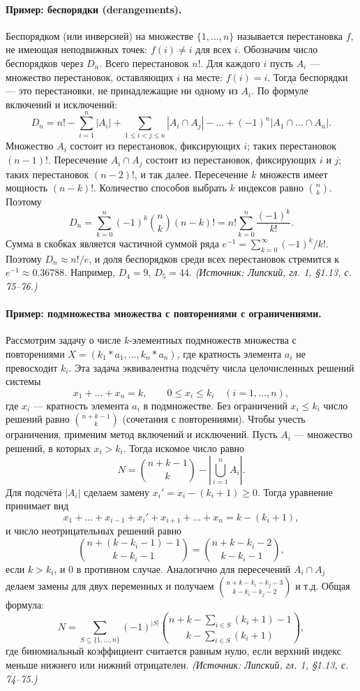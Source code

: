 \documentclass[a4paper,12pt]{article}
\begin{document}
\paragraph{Пример: беспорядки (derangements).}
Беспорядком (или инверсией) на множестве \(\{1,\dots,n\}\) называется перестановка \(f\), не имеющая неподвижных точек: \(f(i)\ne i\) для всех \(i\). Обозначим число беспорядков через \(D_n\). Всего перестановок \(n!\). Для каждого \(i\) пусть \(A_i\) — множество перестановок, оставляющих \(i\) на месте: \(f(i)=i\). Тогда беспорядки — это перестановки, не принадлежащие ни одному из \(A_i\). По формуле включений и исключений:
\[
D_n = n! - \sum_{i=1}^n |A_i| + \sum_{1\le i<j\le n} |A_i\cap A_j| - \dots + (-1)^n |A_1\cap\dots\cap A_n|.
\]
Множество \(A_i\) состоит из перестановок, фиксирующих \(i\); таких перестановок \((n-1)!\). Пересечение \(A_i\cap A_j\) состоит из перестановок, фиксирующих \(i\) и \(j\); таких перестановок \((n-2)!\), и так далее. Пересечение \(k\) множеств имеет мощность \((n-k)!\). Количество способов выбрать \(k\) индексов равно \(\binom{n}{k}\). Поэтому
\[
D_n = \sum_{k=0}^{n} (-1)^k \binom{n}{k} (n-k)! = n! \sum_{k=0}^{n} \frac{(-1)^k}{k!}.
\]
Сумма в скобках является частичной суммой ряда \(e^{-1} = \sum_{k=0}^{\infty} (-1)^k/k!\). Поэтому \(D_n \approx n!/e\), и доля беспорядков среди всех перестановок стремится к \(e^{-1} \approx 0.36788\). Например, \(D_4 = 9\), \(D_5 = 44\).
\textit{(Источник: Липский, гл. 1, §1.13, с. 75--76.)}

\paragraph{Пример: подмножества множества с повторениями с ограничениями.}
Рассмотрим задачу о числе \(k\)-элементных подмножеств множества с повторениями \(X = (k_1 * a_1, \dots, k_n * a_n)\), где кратность элемента \(a_i\) не превосходит \(k_i\). Эта задача эквивалентна подсчёту числа целочисленных решений системы
\[
x_1+\dots+x_n = k, \qquad 0\le x_i\le k_i \quad (i=1,\dots,n),
\]
где \(x_i\) — кратность элемента \(a_i\) в подмножестве. Без ограничений \(x_i\le k_i\) число решений равно \(\binom{n+k-1}{k}\) (сочетания с повторениями). Чтобы учесть ограничения, применим метод включений и исключений. Пусть \(A_i\) — множество решений, в которых \(x_i > k_i\). Тогда искомое число равно
\[
N = \binom{n+k-1}{k} - \left|\bigcup_{i=1}^n A_i\right|.
\]
Для подсчёта \(|A_i|\) сделаем замену \(x_i' = x_i - (k_i+1)\ge 0\). Тогда уравнение принимает вид
\[
x_1+\dots+x_{i-1}+x_i'+x_{i+1}+\dots+x_n = k - (k_i+1),
\]
и число неотрицательных решений равно
\[
\binom{n + (k - k_i -1) -1}{k - k_i -1} = \binom{n+k-k_i-2}{k-k_i-1},
\]
если \(k > k_i\), и \(0\) в противном случае. Аналогично для пересечений \(A_i\cap A_j\) делаем замены для двух переменных и получаем \(\binom{n+k-k_i-k_j-3}{k-k_i-k_j-2}\) и т.д. Общая формула:
\[
N = \sum_{S\subseteq\{1,\dots,n\}} (-1)^{|S|} \binom{n+k - \sum_{i\in S}(k_i+1) - 1}{k - \sum_{i\in S}(k_i+1)},
\]
где биномиальный коэффициент считается равным нулю, если верхний индекс меньше нижнего или нижний отрицателен.
\textit{(Источник: Липский, гл. 1, §1.13, с. 74--75.)}
\end{document}
